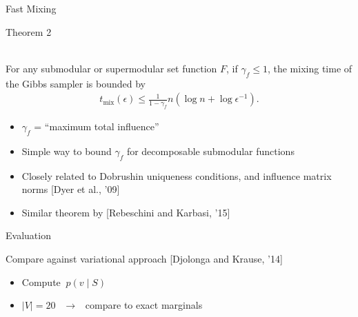 \documentclass[mathserif]{beamer}
\newcommand{\qcite}[1]{{\scriptsize\color{col2}[#1]}}
\newcommand{\qtheorem}[2]{%
\begin{tcolorbox}[enhanced jigsaw,size=tight,boxsep=7pt,boxrule=0.7pt,coltext=textcolor,colframe=col2,colback=col1,opacityback=0,opacityframe=1]
\begin{minipage}{\textwidth}
{\color{col2}\strut Theorem #1}\\[0.7em]
#2
\end{minipage}
\end{tcolorbox}%
}
\begin{document}
\begin{frame}{Fast Mixing}
\vspace{0.5em}
\qtheorem{2}{
For any submodular or supermodular set function $F$, if $\gamma_f \leq 1$, the mixing time of the Gibbs sampler is bounded by
\vspace{-0.5em}
\begin{align*}
t_{\textrm{mix}}(\epsilon) \leq \frac{1}{1 - \gamma_f} n \left(\log n + \log\epsilon^{-1}\right).
\end{align*}
}

\vspace{0.5em}
\begin{itemize}
\item<1-> $\gamma_f$ = ``maximum total influence''
\vspace{0.5em}
\item<2-> Simple way to bound $\gamma_f$ for decomposable submodular functions
\vspace{0.5em}
\item<3-> Closely related to Dobrushin uniqueness conditions, and influence matrix norms \qcite{Dyer et al., '09}
\vspace{0.5em}
\item<4-> Similar theorem by \qcite{Rebeschini and Karbasi, '15}
\end{itemize}
\end{frame}

\begin{frame}{Evaluation}
\vspace{0.5em}

Compare against variational approach \qcite{Djolonga and Krause, '14}

\vspace{2em}
\centering
{}%

\vspace{2em}
\begin{itemize}
\item<3-> Compute $\ p(v \mid S)$
\vspace{0.5em}
\item<4-> $|V| = 20$ $\ \ \longrightarrow\ \ $ compare to exact marginals
\end{itemize}
\end{frame}
\end{document}
